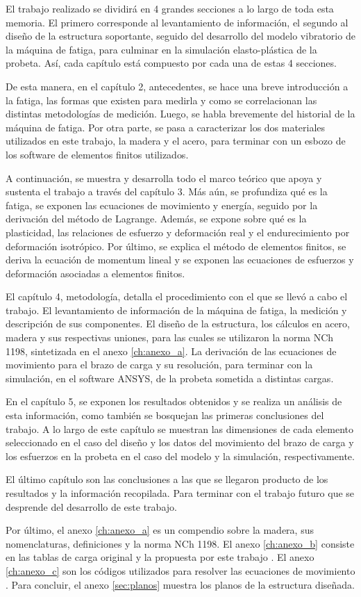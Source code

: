 El trabajo realizado se dividirá en 4 grandes secciones a lo largo de toda esta memoria. El primero corresponde al levantamiento de información, el segundo al diseño de la estructura soportante, seguido del desarrollo del modelo vibratorio de la máquina de fatiga, para culminar en la simulación elasto-plástica de la probeta. Así, cada capítulo está compuesto por cada una de estas 4 secciones.

De esta manera, en el capítulo 2, antecedentes, se hace una breve introducción a la fatiga, las formas que existen para medirla y como se correlacionan  las distintas metodologías de medición. Luego, se habla brevemente del historial de la máquina de fatiga. Por otra parte, se pasa a caracterizar los dos materiales utilizados en este trabajo, la madera y el acero, para terminar con un esbozo de los software de elementos finitos utilizados.

A continuación, se muestra y desarrolla todo el marco teórico que apoya y sustenta el trabajo a través del capítulo 3. Más aún, se profundiza qué es la fatiga, se exponen las ecuaciones de movimiento y energía, seguido por la derivación del método de Lagrange. Además, se expone sobre qué es la plasticidad, las relaciones de esfuerzo y deformación real y el endurecimiento por deformación isotrópico. Por último, se explica el método de elementos finitos, se deriva la ecuación de momentum lineal y se exponen las ecuaciones de esfuerzos y deformación asociadas a elementos finitos.

El capítulo 4, metodología, detalla el procedimiento con el que se llevó a cabo el trabajo. El levantamiento de información de la máquina de fatiga, la medición y descripción de sus componentes. El diseño de la estructura, los cálculos en acero, madera y sus respectivas uniones, para las cuales se utilizaron la norma NCh 1198, sintetizada en el anexo \ref{ch:anexo_a}. La derivación de las ecuaciones de movimiento para el brazo de carga y su resolución, para terminar con la simulación, en el software ANSYS, de la probeta sometida a distintas cargas.

En el capítulo 5, se exponen los resultados obtenidos y se realiza un análisis de esta información, como también se bosquejan las primeras conclusiones del trabajo. A lo largo de este capítulo se muestran las dimensiones de cada elemento seleccionado en el caso del diseño y los datos del movimiento del brazo de carga y los esfuerzos en la probeta en el caso del modelo y la simulación, respectivamente.

El último capítulo son las conclusiones a las que se llegaron producto de los resultados y la información recopilada. Para terminar con el trabajo futuro que se desprende del desarrollo de este trabajo.

Por último, el anexo \ref{ch:anexo_a} es un compendio sobre la madera, sus nomenclaturas, definiciones y la norma NCh 1198. El anexo \ref{ch:anexo_b} consiste en las tablas de carga original y la propuesta por este trabajo . El anexo \ref{ch:anexo_c} son los códigos utilizados para resolver las ecuaciones de movimiento . Para concluir, el anexo \ref{sec:planos} muestra los planos de la estructura diseñada.



